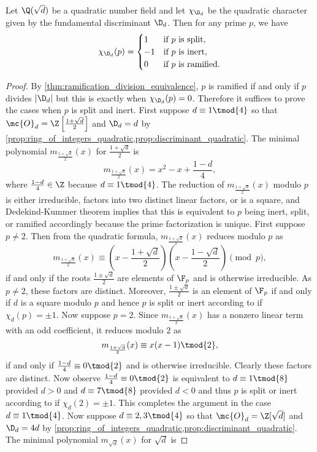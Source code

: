     \begin{proposition}\label{prop:factorization_of_primes_quadratic}
      Let $\Q(\sqrt{d})$ be a quadratic number field and let $\chi_{\D_{d}}$ be the quadratic character given by the fundamental discriminant $\D_{d}$. Then for any prime $p$, we have
      \[
        \chi_{\D_{d}}(p) = \begin{cases} 1 & \text{if $p$ is split}, \\ -1 & \text{if $p$ is inert}, \\ 0 & \text{if $p$ is ramified}. \end{cases}
      \]
    \end{proposition}
    \begin{proof}
      By \cref{thm:ramification_division_equivalence}, $p$ is ramified if and only if $p$ divides $|\D_{d}|$ but this is exactly when $\chi_{\D_{d}}(p) = 0$. Therefore it suffices to prove the cases when $p$ is split and inert. First suppose $d \equiv 1 \tmod{4}$ so that $\mc{O}_{d} = \Z\left[\frac{1+\sqrt{d}}{2}\right]$ and $\D_{d} = d$ by \cref{prop:ring_of_integers_quadratic,prop:discriminant_quadratic}. The minimal polynomial $m_{\frac{1+\sqrt{d}}{2}}(x)$ for $\frac{1+\sqrt{d}}{2}$ is
      \[
        m_{\frac{1+\sqrt{d}}{2}}(x) = x^{2}-x+\frac{1-d}{4},
      \]
      where $\frac{1-d}{4} \in \Z$ because $d \equiv 1 \tmod{4}$. The reduction of $m_{\frac{1+\sqrt{d}}{2}}(x)$ modulo $p$ is either irreducible, factors into two distinct linear factors, or is a square, and Dedekind-Kummer theorem implies that this is equivalent to $p$ being inert, split, or ramified accordingly because the prime factorization is unique. First suppose $p \neq 2$. Then from the quadratic formula, $m_{\frac{1+\sqrt{d}}{2}}(x)$ reduces modulo $p$ as
      \[
        m_{\frac{1+\sqrt{d}}{2}}(x) \equiv \left(x-\frac{1+\sqrt{d}}{2}\right)\left(x-\frac{1-\sqrt{d}}{2}\right) \pmod{p},
      \]
      if and only if the roots $\frac{1\pm\sqrt{d}}{2}$ are elements of $\F_{p}$ and is otherwise irreducible. As $p \neq 2$, these factors are distinct. Moreover, $\frac{1\pm\sqrt{d}}{2}$ is an element of $\F_{p}$ if and only if $d$ is a square modulo $p$ and hence $p$ is split or inert according to if $\chi_{d}(p) = \pm1$. Now suppose $p = 2$. Since $m_{\frac{1+\sqrt{d}}{2}}(x)$ has a nonzero linear term with an odd coefficient, it reduces modulo $2$ as
      \[
        m_{\frac{1+\sqrt{d}}{2}}(x) \equiv x(x-1) \tmod{2},
      \]
      if and only if $\frac{1-d}{4} \equiv 0 \tmod{2}$ and is otherwise irreducible. Clearly these factors are distinct. Now observe $\frac{1-d}{4} \equiv 0 \tmod{2}$ is equivalent to $d \equiv 1 \tmod{8}$ provided $d > 0$ and $d \equiv 7 \tmod{8}$ provided $d < 0$ and thus $p$ is split or inert according to if $\chi_{d}(2) = \pm1$. This completes the argument in the case $d \equiv 1 \tmod{4}$. Now suppose $d \equiv 2,3 \tmod{4}$ so that $\mc{O}_{d} = \Z[\sqrt{d}]$ and $\D_{d} = 4d$ by \cref{prop:ring_of_integers_quadratic,prop:discriminant_quadratic}. The minimal polynomial $m_{\sqrt{d}}(x)$ for $\sqrt{d}$ is

\end{proof}
